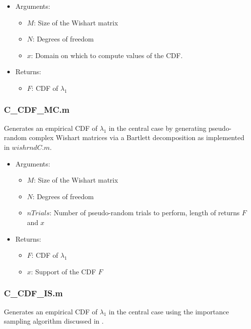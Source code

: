 \begin{itemize}
\item Arguments:
\begin{itemize}
\item $M$: Size of the Wishart matrix
\item $N$: Degrees of freedom
\item $x$: Domain on which to compute values of the CDF.
\end{itemize}
\item Returns:
\begin{itemize}
\item $F$: CDF of $\lambda_1$
\end{itemize}
\end{itemize}



\subsubsection*{C\_CDF\_MC.m}

Generates an empirical CDF of $\lambda_1$ in the central case by generating pseudo-random complex Wishart matrices via a Bartlett decomposition as implemented in $wishrndC.m$.

\begin{itemize}
\item Arguments:
\begin{itemize}
\item $M$: Size of the Wishart matrix
\item $N$: Degrees of freedom
\item $nTrials$: Number of pseudo-random trials to perform, length of returns $F$ and $x$
\end{itemize}
\item Returns:
\begin{itemize}
\item $F$: CDF of $\lambda_1$
\item $x$: Support of the CDF $F$
\end{itemize}
\end{itemize}




\subsubsection*{C\_CDF\_IS.m}

Generates an empirical CDF of $\lambda_1$ in the central case using the importance sampling algorithm discussed in \cite{Jiang_2014}.

